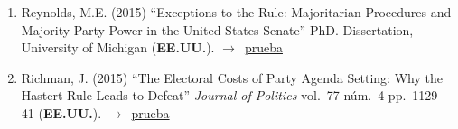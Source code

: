 \documentclass[12 pt, letter]{article}
\newenvironment{CitasMiTrabajo}{
    \begin{footnotesize}
    \begin{enumerate}[label={\footnotesize\emph{cita~\arabic*}},ref=\arabic*] %
        \setlength{\itemsep}{.1\itemsep}
        \setlength{\parskip}{.1\parskip}
    }{\end{enumerate}\end{footnotesize}}
\begin{document}
\begin{CitasMiTrabajo}
        \item Reynolds, M.E. (2015) ``Exceptions to the Rule: Majoritarian Procedures and Majority Party Power in the United States Senate'' PhD. Dissertation, University of Michigan (\textbf{EE.UU.}). $\rightarrow$~\href{http://ericmagar.com/cv/cites/coxMagar/reynolds2015.pdf}{prueba}

        \item Richman, J. (2015) ``The Electoral Costs of Party Agenda Setting: Why the Hastert Rule Leads to Defeat'' \emph{Journal of Politics} vol.\ 77 n\'um.\ 4 pp.\ 1129--41 (\textbf{EE.UU.}). $\rightarrow$~\href{http://ericmagar.com/cv/cites/coxMagar/richmanEllCosts2015jop.pdf}{prueba}


        \label{ncites:cox.magar.1999} %


\end{CitasMiTrabajo}
\end{document}
